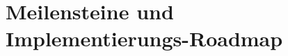 \documentclass[11pt,a4paper]{article}
\begin{document}

\section{Meilensteine und Implementierungs-Roadmap}



    
    
\end{document}
